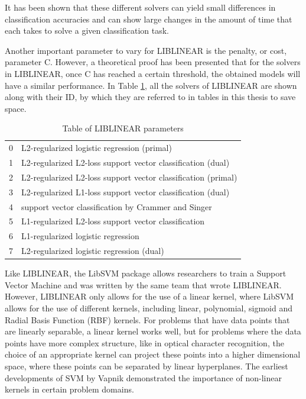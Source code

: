 \documentclass[12pt,oneside]{book}
\begin{document}
It has been shown \cite{rongen2008liblinear} that these different solvers
can yield small differences in classification accuracies and can show
large changes in the amount of time that each takes to solve a given
classification task.

Another important parameter to vary for LIBLINEAR is the penalty, or
cost, parameter C.  However, a theoretical proof has been presented
\cite{keerthi2003asymptotic} that for the solvers in LIBLINEAR, once C
has reached a certain threshold, the obtained models will have a
similar performance.  In Table \ref{table:liblinearSolvers}, all the
solvers of LIBLINEAR are shown along with their ID, by which they are
referred to in tables in this thesis to save space.

\begin{table}
\begin{tabular}{|l|l|}
\hline
0 & L2-regularized logistic regression (primal) \\
1 & L2-regularized L2-loss support vector classification (dual) \\
2 & L2-regularized L2-loss support vector classification (primal) \\
3 & L2-regularized L1-loss support vector classification (dual) \\
4 & support vector classification by Crammer and Singer \\
5 & L1-regularized L2-loss support vector classification \\
6 & L1-regularized logistic regression \\
7 & L2-regularized logistic regression (dual) \\
\hline
\end{tabular}
\caption{Table of LIBLINEAR parameters}
\label{table:liblinearSolvers}
\end{table}

Like LIBLINEAR, the LibSVM \cite{chang2001libsvm} package allows
researchers to train a Support Vector Machine and was written by the
same team that wrote LIBLINEAR.  However, LIBLINEAR only allows for
the use of a linear kernel, where LibSVM allows for the use of
different kernels, including linear, polynomial, sigmoid and Radial
Basis Function (RBF) kernels.  For problems that have data points that
are linearly separable, a linear kernel works well, but for problems
where the data points have more complex structure, like in optical
character recognition, the choice of an appropriate kernel can project
these points into a higher dimensional space, where these points can
be separated by linear hyperplanes.  The earliest developments of SVM
by Vapnik \cite{cortes1995svm} demonstrated the importance of
non-linear kernels in certain problem domains.
\end{document}
